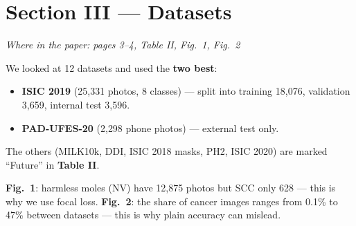 \documentclass[11pt,a4paper]{article}
\newcommand{\where}[1]{{\small\color{hcGray}\textit{Where in the paper: #1}}\par\smallskip}
\begin{document}
\section{Section III --- Datasets}
\where{pages 3--4, Table II, Fig.~1, Fig.~2}
We looked at 12 datasets and used the \textbf{two best}:
\begin{itemize}
  \item \textbf{ISIC 2019} (25{,}331 photos, 8 classes) --- split into
        training 18{,}076, validation 3{,}659, internal test 3{,}596.
  \item \textbf{PAD-UFES-20} (2{,}298 phone photos) --- external test only.
\end{itemize}
The others (MILK10k, DDI, ISIC 2018 masks, PH2, ISIC 2020) are marked
``Future'' in \textbf{Table II}.

\textbf{Fig.~1}: harmless moles (NV) have 12{,}875 photos but SCC only 628
--- this is why we use focal loss. \textbf{Fig.~2}: the share of cancer
images ranges from 0.1\% to 47\% between datasets --- this is why plain
accuracy can mislead.

\end{document}

